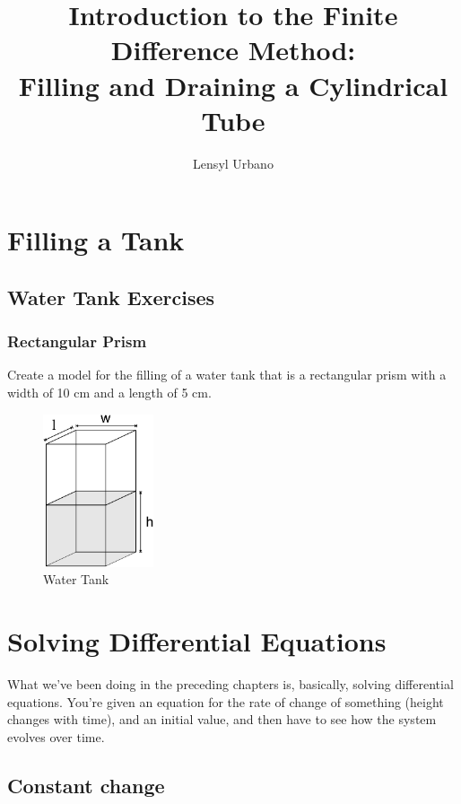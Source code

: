 \documentclass[11pt,fleqn]{book}
\title{Introduction to the Finite Difference Method: \\ Filling and Draining a Cylindrical Tube}
\author{Lensyl Urbano}
\begin{document}
         
 
\maketitle

\chapter{Filling a Tank}

    \section{Water Tank Exercises}

	\subsection{Rectangular Prism}
	
		Create a model for the filling of a water tank that is a rectangular prism with a width of 10 cm and a length of 5 cm.
		
	\begin{figure}[h!]
		\begin{center}
			\includegraphics[height=4.5cm]{prism-lwh.pdf}
			\caption{Water Tank}
		\end{center}
	\end{figure}


	
\chapter{Solving Differential Equations}

	What we've been doing in the preceding chapters is, basically, solving differential equations. You're given an equation for the rate of change of something (height changes with time), and an initial value, and then have to see how the system evolves over time. 
	
	\section{Constant change}
	
\end{document}
